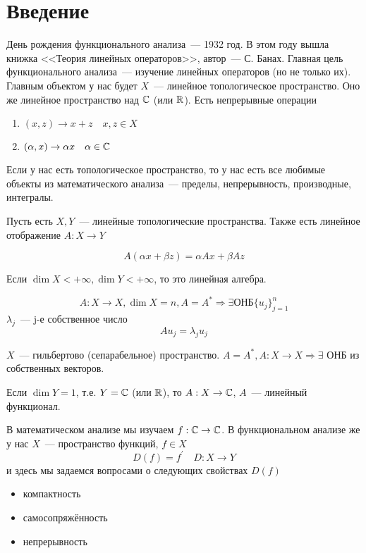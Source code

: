\documentclass[document]{subfiles}
\begin{document}
\chapter{Введение}
День рождения функционального анализа~--- 1932 год. В этом году вышла книжка <<Теория линейных операторов>>, автор~--- С. Банах. Главная цель функционального анализа~--- изучение линейных операторов (но не только их). Главным объектом у нас будет $X$~--- линейное топологическое пространство. Оно же линейное пространство над $\mathbb{C}$ (или $\mathbb{R}$).
Есть непрерывные операции
\begin{enumerate}
    \item $(x,z) \rightarrow x + z \quad x,z \in X$
    \item $(\alpha,x) \rightarrow \alpha x \quad \alpha \in \mathbb{C}$
\end{enumerate}
Если у нас есть топологическое пространство, то у нас есть все любимые объекты из математического анализа~--- пределы, непрерывность, производные, интегралы.

Пусть есть $X,Y$~--- линейные топологические пространства. Также есть линейное отображение $A: X \rightarrow Y$
\begin{definition}
    \[ A(\alpha x + \beta z) = \alpha A x + \beta A z \]
\end{definition}

Если $\dim X < + \infty, \dim Y < + \infty$, то это линейная алгебра.

\[A: X \rightarrow X, \dim X = n, A = A^* \Rightarrow \exists \text {ОНБ} \{u_j\}_{j=1}^n \]
$\lambda_j$~--- j-е собственное число
\[ A u_j = \lambda_j u_j \]
\begin{theorem}[Гильберт]
    $X$~--- гильбертово (сепарабельное) пространство.
    $A = A^*, A: X \rightarrow X \Rightarrow \exists$ ОНБ из собственных векторов.
\end{theorem}

Если $\dim Y = 1$, т.е. $Y = \mathbb{C}$ (или $\mathbb{R}$), то $A: X \rightarrow \mathbb{C}$, $A$~--- линейный функционал.

В математическом анализе мы изучаем $f: \mathbb{C} \rightarrow \mathbb{C}$.
В функциональном анализе же у нас $X$~--- пространство функций, $f \in X$
   \[ D(f) =  f^\prime \quad D: X \rightarrow Y \]
и здесь мы задаемся вопросами о следующих свойствах $D(f)$
\begin{itemize}
    \item компактность
    \item самосопряжённость
    \item непрерывность
\end{itemize}
\end{document}
